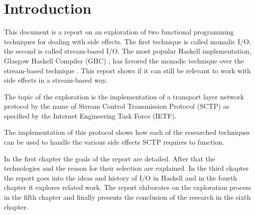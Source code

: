 \chapter*{Introduction}


This document is a report on an exploration of two functional programming techniques for dealing with side effects.
The first technique is called monadic I/O, the second is called stream-based I/O.
The most popular Haskell implementation, Glasgow Haskell Compiler (GHC) \cite{haskell_implementations}, has favored the monadic technique over the stream-based technique \cite{hudak_history_2007}.
This report shows if it can still be relevant to work with side effects in a stream-based way. 

The topic of the exploration is the implementation of a transport layer network protocol by the name of Stream Control Transmission Protocol (SCTP) as specified by the Internet Engineering Task Force (IETF).

The implementation of this protocol shows how each of the researched techniques can be used to handle the various side effects SCTP requires to function. 

In the first chapter the goals of the report are detailed. After that the technologies and the reason for their selection are explained. In the third chapter the report goes into the ideas and history of I/O in Haskell and in the fourth chapter it explores related work.
The report elaborates on the exploration process in the fifth chapter and finally presents the conclusion of the research in the sixth chapter.
